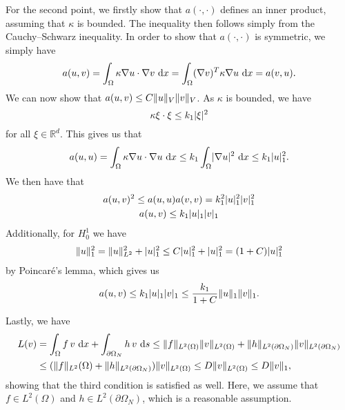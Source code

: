 For the second point, we firstly show that $a(\cdot, \cdot)$ defines an inner product, assuming that $\kappa$ is bounded.
The inequality then follows simply from the Cauchy--Schwarz inequality. %
In order to show that $a(\cdot, \cdot)$ is symmetric, we simply have
\begin{equation}
    a(u, v) = \int_\Omega \kappa \nabla u \cdot \nabla v \, \mathop{}\!\mathrm{d} x
    = \int_\Omega (\nabla v)^T \kappa \nabla u \, \mathop{}\!\mathrm{d} x
    = a(v, u).
\end{equation}
We can now show that $a(u, v) \leq C \lVert u\rVert_V \lVert v\rVert_V$.
As $\kappa$ is bounded, we have
\begin{equation}
    \kappa \xi \cdot \xi \leq k_1 \lvert\xi\rvert^2
\end{equation}
for all $\xi \in \mathbb{R}^d$.
This gives us that
\begin{equation}
    a(u, u) = \int_\Omega \kappa \nabla u \cdot \nabla u \, \mathop{}\!\mathrm{d} x
    \leq k_1 \int_\Omega \lvert\nabla u\rvert^2 \, \mathop{}\!\mathrm{d} x
    \leq k_1 \lvert u\rvert_1^2.
\end{equation}
We then have that
\begin{gather*}
    a(u, v)^2 \leq a(u, u) a(v, v) = k_1^2 \lvert u\rvert_1^2 \lvert v\rvert_1^2 \\
    a(u, v) \leq k_1 \lvert u\rvert_1 \lvert v\rvert_1
\end{gather*}
Additionally, for $H^1_0$ we have
\begin{align*}
    \lVert u\rVert_1^2 = \lVert u\rVert_{L^2}^2 + \lvert u\rvert_1^2
    \leq C \lvert u\rvert_1^2 + \lvert u\rvert_1^2
    = (1 + C) \lvert u\rvert_1^2
\end{align*}
by Poincaré's lemma, which gives us
\begin{equation}
    a(u, v) \leq k_1 \lvert u\rvert_1 \lvert v\rvert_1
    \leq \frac{k_1}{1 + C} \lVert u\rVert_1 \lVert v\rVert_1.
\end{equation}

Lastly, we have
\begin{align*}
    L(v)
    &= \int_\Omega f \, v \, \mathop{}\!\mathrm{d} x + \int_{\partial\Omega_N} h \, v \, \mathop{}\!\mathrm{d} s
    \leq \lVert f\rVert_{L^2(\Omega)} \lVert v\rVert_{L^2(\Omega)} + \lVert h\rVert_{L^2(\partial\Omega_N)} \lVert v\rVert_{L^2(\partial\Omega_N)} \\
    &\leq (\lVert f\rVert_{L^2}(\Omega) + \lVert h\rVert_{L^2(\partial\Omega_N)}) \lVert v\rVert_{L^2(\Omega)}
    \leq D \lVert v\rVert_{L^2(\Omega)}
    \leq D \lVert v\rVert_1,
\end{align*}
showing that the third condition is satisfied as well.
Here, we assume that $f \in L^2(\Omega)$ and $h \in L^2(\partial\Omega_N)$, which is a reasonable assumption.

